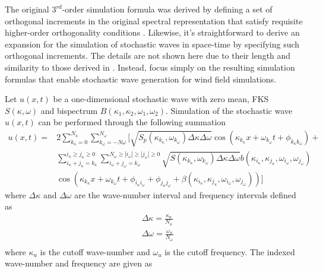 \documentclass[preprint, review, 12pt]{elsarticle}
\begin{document}
The original $3^{rd}$-order simulation formula was derived by defining a set of orthogonal increments in the original spectral representation that satisfy requisite higher-order orthogonality conditions \cite{Shields2017,Vandanapu2021}. Likewise, it's straightforward to derive an expansion for the simulation of stochastic waves in space-time by specifying such orthogonal increments. The details are not shown here due to their length and similarity to those derived in \cite{Shields2017,Vandanapu2021}. Instead, focus simply on the resulting simulation formulas that enable stochastic wave generation for wind field simulations.

Let $u(x, t)$ be a one-dimensional stochastic wave with zero mean, FKS $S(\kappa, \omega)$ and bispectrum $B(\kappa_1, \kappa_2, \omega_1, \omega_2)$. Simulation of the stochastic wave $u(x, t)$ can be performed through the following summation
\begin{equation}
\begin{aligned}
	u(x, t) = & 2 \sum_{k_\kappa=0}^{N_\kappa} \sum_{k_\omega=-N\omega}^{N_\omega} \Bigg[ \sqrt{S_{p}(\kappa_{k_\kappa}, \omega_{k_\omega}) \Delta\kappa \Delta \omega} \cos(\kappa_{k_\kappa}x + \omega_{k_\omega}t + \phi_{k_\kappa k_\omega}) +\\
& \sum_{i_\kappa + j_\kappa = k_\kappa }^{i_\kappa \geq j_\kappa \geq 0} \sum_{i_\omega + j_\omega = k_\omega}^{N_{\omega} \geq |i_\omega| \geq |j_\omega| \geq 0} \sqrt{S(\kappa_{k_{\kappa}}, \omega_{k_\omega})\Delta\kappa\Delta\omega}  b(\kappa_{i_\kappa}, \kappa_{j_\kappa}, \omega_{i_\omega}, \omega_{j_\omega})\\
& \cos(\kappa_{k_\kappa}x + \omega_{k_\omega}t + \phi_{i_\kappa i_\omega} + \phi_{j_\kappa j_\omega}  + \beta(\kappa_{i_\kappa}, \kappa_{j_\kappa}, \omega_{i_\omega}, \omega_{j_\omega}) ) \Bigg]
\label{eqn:truncated_cosines_1d_wave}
\end{aligned}
\end{equation}
where $\Delta \kappa$ and $\Delta \omega$ are the wave-number interval and frequency intervals defined as
\begin{equation}
\begin{aligned}
    &\Delta \kappa = \frac{\kappa_{u}}{N_\kappa}\\
	&\Delta \omega = \frac{\omega_{u}}{N_{\omega}}\\
\end{aligned}
\end{equation}
where $\kappa_{u}$ is the cutoff wave-number and $\omega_u$ is the cutoff frequency. The indexed wave-number and frequency are given as
\end{document}
